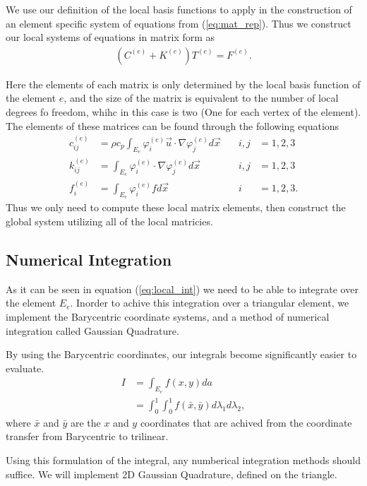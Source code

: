 \documentclass[../fem.tex]{subfiles}
\begin{document}
We use our definition of the local basis functions to apply in the construction
of an element specific system of equations from (\ref{eq:mat_rep}). Thus we
construct our local systems of equations in matrix form as
\begin{align*}
  \left(C^{(e)}+K^{(e)}\right)T^{(e)}=F^{(e)}.
\end{align*}

Here the elements of each matrix is only determined by the local basis function
of the element $e$, and the size of the matrix is equivalent to the number of
local degrees fo freedom, whihc in this case is two (One for each vertex of the
element). The elements of these matrices can be found through the following
equations
\begin{align}\label{eq:local_int}
  c_{ij}^{(e)}&=\rho
  c_p\int_{E_e}\varphi_i^{(e)}\vec{u}\cdot\nabla\varphi_j^{(e)}d\vec{x}\quad&i,j&=1,2,3\\
  k_{ij}^{(e)}&=\int_{E_e}\varphi_i^{(e)}\cdot\nabla\varphi_j^{(e)}d\vec{x}\quad&i,j&=1,2,3\\
  f_i^{(e)}&=\int_{E_e}\varphi_i^{(e)}fd\vec{x}\quad&i&=1,2,3.
\end{align}
Thus we only need to compute these local matrix elements, then construct the
global system utilizing all of the local matricies.

\subsection{Numerical Integration}%
\label{sub:numerical_integration}

As it can be seen in equation (\ref{eq:local_int}) we need to be able to
integrate over the element $E_e$. Inorder to achive this integration over a
triangular element, we implement the Barycentric coordinate systems, and a
method of numerical integration called Gaussian Quadrature.

By using the Barycentric coordinates, our integrals become significantly easier
to evaluate.
\begin{align*}
  I&=\int_{E_e}f(x,y)da\\
   &=\int_0^1\int_0^1f\left(\bar{x}, \bar{y}\right)d\lambda_1 d\lambda_2,
\end{align*}
where $\bar{x}$ and $\bar{y}$ are the $x$ and $y$ coordinates that are achived
from the coordinate transfer from Barycentric to trilinear.

Using this formulation of the integral, any numberical integration methods
should suffice. We will implement 2D Gaussian Quadrature, defined on the
triangle.
\end{document}
